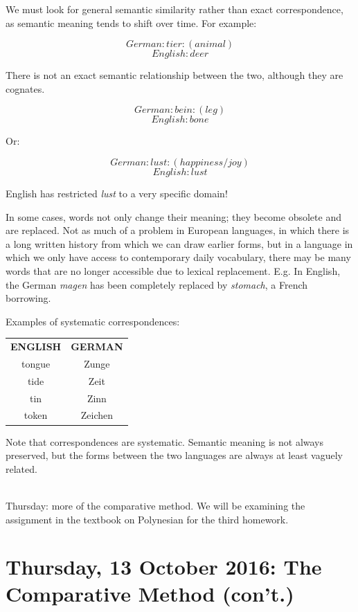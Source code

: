 \documentclass{exam}
\begin{document}
We must look for general semantic similarity rather than exact correspondence, as semantic meaning tends to shift over time. For example: 

$$German: tier: (animal)$$
$$English: deer$$

There is not an exact semantic relationship between the two, although they are cognates. 

$$German: bein: (leg)$$
$$English: bone$$

Or: 

$$German: lust: (happiness/joy)$$
$$English: lust$$

English has restricted \textit{lust} to a very specific domain!

In some cases, words not only change their meaning; they become obsolete and are replaced. Not as much of a problem in European languages, in which there is a long written history from which we can draw earlier forms, but in a language in which we only have access to contemporary daily vocabulary, there may be many words that are no longer accessible due to lexical replacement. E.g. In English, the German \textit{magen} has been completely replaced by \textit{stomach}, a French borrowing. 

Examples of systematic correspondences:
\begin{center}

\begin{tabular}{|c|c|} 

\textbf{ENGLISH} & \textbf{GERMAN}\\

tongue & Zunge\\
tide & Zeit\\
tin & Zinn\\
token & Zeichen\\


\end{tabular}
\end{center}

Note that correspondences are systematic. Semantic meaning is not always preserved, but the forms between the two languages are always at least vaguely related.

\noindent \\Thursday: more of the comparative method. We will be examining the assignment in the textbook on Polynesian for the third homework.



\section*{Thursday, 13 October 2016: The Comparative Method (con't.) }
\end{document}
